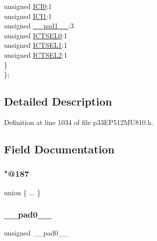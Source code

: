 \begin{DoxyCompactItemize}
\begin{tabbing}
\>\>unsigned \hyperlink{structtag_i_c10_c_o_n1_b_i_t_s_a6f1b5da2706b7c15fc8c9a01a30deaff}{ICI0}:1\\
\>\>unsigned \hyperlink{structtag_i_c10_c_o_n1_b_i_t_s_a7d5c777f0bc43f66f40462f79ed2179c}{ICI1}:1\\
\>\>unsigned \hyperlink{structtag_i_c10_c_o_n1_b_i_t_s_acaf2d0924a107ec6e8d2e31febaf66f9}{\_\_pad1\_\_}:3\\
\>\>unsigned \hyperlink{structtag_i_c10_c_o_n1_b_i_t_s_af6dd4d0e816b18462680d4b22fa926d3}{ICTSEL0}:1\\
\>\>unsigned \hyperlink{structtag_i_c10_c_o_n1_b_i_t_s_aa29140e739d886362537f87d199c4134}{ICTSEL1}:1\\
\>\>unsigned \hyperlink{structtag_i_c10_c_o_n1_b_i_t_s_a47d80892d449e6edbd5ba2ba9ff06deb}{ICTSEL2}:1\\
\>\} \\
\}; \\

\end{tabbing}\end{DoxyCompactItemize}


\subsection{Detailed Description}


Definition at line 1034 of file p33\+E\+P512\+M\+U810.\+h.



\subsection{Field Documentation}
\mbox{\label{structtag_i_c10_c_o_n1_b_i_t_s_a402b57f36af1815b3b470b04b98a8c8f}} 
\subsubsection{\texorpdfstring{"@187}{@187}}
{\footnotesize\ttfamily union \{ ... \} }

\mbox{\label{structtag_i_c10_c_o_n1_b_i_t_s_adf71f3d8410c1f1dbbc96680a92c49af}} 
\subsubsection{\texorpdfstring{\+\_\+\+\_\+pad0\+\_\+\+\_\+}{\_\_pad0\_\_}}
{\footnotesize\ttfamily unsigned \+\_\+\+\_\+pad0\+\_\+\+\_\+}




